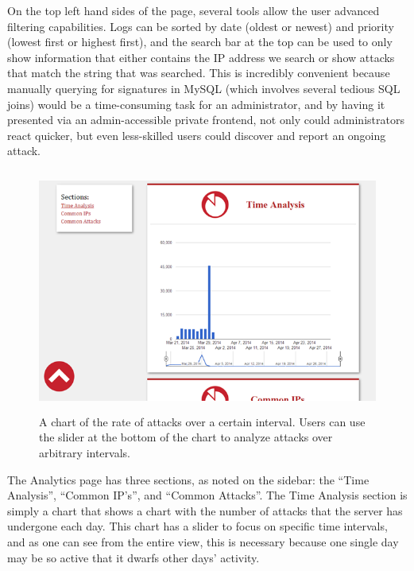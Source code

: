 \documentclass[12pt,letterpaper,titlepage]{report}
\begin{document}
{On the top left hand sides of the page, several tools allow the user advanced
filtering capabilities. Logs can be sorted by date (oldest or newest) and
priority (lowest first or highest first), and the search bar at the top can be
used to only show information that either contains the IP address we search or
show attacks that match the string that was searched. This is incredibly
convenient because manually querying for signatures in MySQL (which involves
several tedious SQL joins) would be a time-consuming task for an administrator,
and by having it presented via an admin-accessible private frontend, not only
could administrators react quicker, but even less-skilled users could discover
and report an ongoing attack.

\begin{figure}[b!]
\centering
  \includegraphics[height=8cm]{./timeanalysis.png}
  \caption{A chart of the rate of attacks over a certain interval. Users
  can use the slider at the bottom of the chart to analyze attacks over
  arbitrary intervals.}
\end{figure}

The Analytics page has three sections, as noted on the sidebar: the “Time
Analysis”, “Common IP’s”, and “Common Attacks”. The Time Analysis section is
simply a chart that shows a chart with the number of attacks that the server has
undergone each day. This chart has a slider to focus on specific time intervals,
and as one can see from the entire view, this is necessary because one single
day may be so active that it dwarfs other days’ activity.


}
\end{document}
